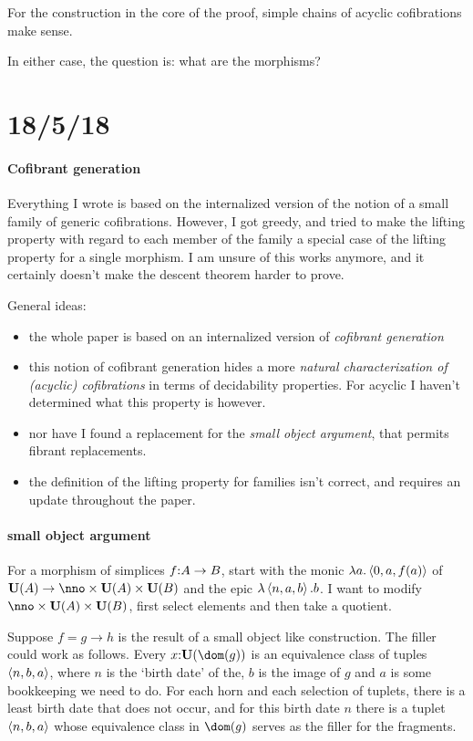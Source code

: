 \documentclass[csh.tex]{subfiles}
\begin{document}
For the construction in the core of the proof, simple chains of acyclic cofibrations make sense.

In either case, the question is: what are the morphisms?



\section{18/5/18}

\paragraph{Cofibrant generation}
Everything I wrote is based on the internalized version of the notion of a small family of generic cofibrations. However, I got greedy, and tried to make the lifting property with regard to each member of the family a special case of the lifting property for a single morphism. I am unsure of this works anymore, and it certainly doesn't make the descent theorem harder to prove.

General ideas:
\begin{itemize}
\item the whole paper is based on an internalized version of \emph{cofibrant generation}
\item this notion of cofibrant generation hides a more \emph{natural characterization of (acyclic) cofibrations} in terms of decidability properties. For acyclic I haven't determined what this property is however.
\item nor have I found a replacement for the \emph{small object argument}, that permits fibrant replacements.
\item the definition of the lifting property for families isn't correct, and requires an update throughout the paper.
\end{itemize}


\paragraph{small object argument}

For a morphism of simplices $f\mathord : A \to B$, start with the monic
$\lambda a .\left\langle 0,a,f(a) \right\rangle$ of $\base(A)\to \nno\times\base(A)\times \base(B)$ and the epic $\lambda \left\langle n,a,b \right\rangle .b$. I want to modify $\nno\times\base(A)\times \base(B)$, first select elements and then take a quotient.

Suppose $f = g\to h$ is the result of a small object like construction. The filler could work as follows. Every $x\of\base(\dom(g))$ is an equivalence class of tuples $\left\langle n,b,a \right\rangle$, where $n$ is the `birth date' of the, $b$ is the image of $g$ and $a$ is some bookkeeping we need to do. For each horn and each selection of tuplets, there is a least birth date that does not occur, and for this birth date $n$ there is a tuplet $\left\langle n,b,a \right\rangle$ whose equivalence class in $\dom(g)$ serves as the filler for the fragments.
\end{document}
